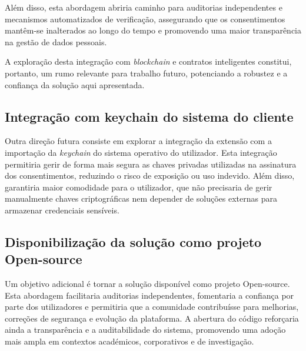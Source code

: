 Além disso, esta abordagem abriria caminho para auditorias independentes e mecanismos automatizados de verificação, assegurando que os consentimentos mantêm-se inalterados ao longo do tempo e promovendo uma maior transparência na gestão de dados pessoais.  

A exploração desta integração com \textit{blockchain} e contratos inteligentes constitui, portanto, um rumo relevante para trabalho futuro, potenciando a robustez e a confiança da solução aqui apresentada.

\subsection{Integração com keychain do sistema do cliente}

Outra direção futura consiste em explorar a integração da extensão com a importação da \textit{keychain} do sistema operativo do utilizador. Esta integração permitiria gerir de forma mais segura as chaves privadas utilizadas na assinatura dos consentimentos, reduzindo o risco de exposição ou uso indevido. Além disso, garantiria maior comodidade para o utilizador, que não precisaria de gerir manualmente chaves criptográficas nem depender de soluções externas para armazenar credenciais sensíveis.

\subsection{Disponibilização da solução como projeto Open-source}

Um objetivo adicional é tornar a solução disponível como projeto Open-source. Esta abordagem facilitaria auditorias independentes, fomentaria a confiança por parte dos utilizadores e permitiria que a comunidade contribuísse para melhorias, correções de segurança e evolução da plataforma. A abertura do código reforçaria ainda a transparência e a auditabilidade do sistema, promovendo uma adoção mais ampla em contextos académicos, corporativos e de investigação.

